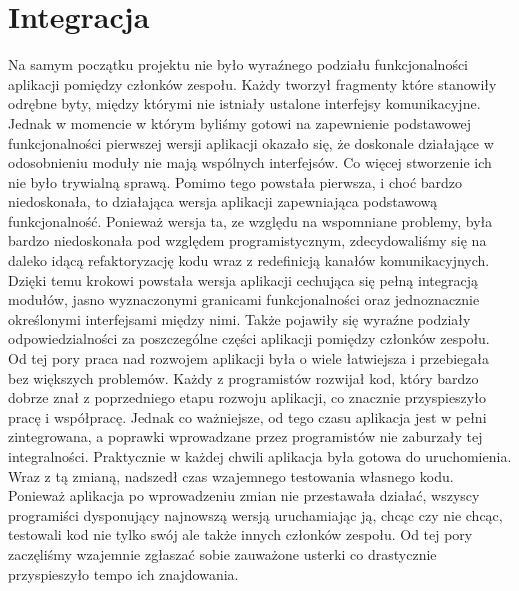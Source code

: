 \section{Integracja}
Na samym początku projektu nie było wyraźnego podziału funkcjonalności aplikacji pomiędzy członków zespołu. Każdy tworzył fragmenty które stanowiły odrębne byty, między którymi nie istniały ustalone interfejsy komunikacyjne. Jednak w momencie w którym byliśmy gotowi na zapewnienie podstawowej funkcjonalności pierwszej wersji aplikacji okazało się, że doskonale działające w odosobnieniu moduły nie mają wspólnych interfejsów. Co więcej stworzenie ich nie było trywialną sprawą. Pomimo tego powstała pierwsza, i choć bardzo niedoskonała, to działająca wersja aplikacji zapewniająca podstawową funkcjonalność.
Ponieważ wersja ta, ze względu na wspomniane problemy, była bardzo niedoskonała pod względem programistycznym, zdecydowaliśmy się na daleko idącą refaktoryzację kodu wraz z redefinicją kanałów komunikacyjnych. Dzięki temu krokowi powstała wersja aplikacji cechująca się pełną integracją modułów, jasno wyznaczonymi granicami funkcjonalności oraz jednoznacznie określonymi interfejsami między nimi. Także pojawiły się wyraźne podziały odpowiedzialności za poszczególne części aplikacji pomiędzy członków zespołu.
Od tej pory praca nad rozwojem aplikacji była o wiele łatwiejsza i przebiegała bez większych problemów. Każdy z programistów rozwijał kod, który bardzo dobrze znał z poprzedniego etapu rozwoju aplikacji, co znacznie przyspieszyło pracę i współpracę. Jednak co ważniejsze, od tego czasu aplikacja jest w pełni zintegrowana, a poprawki wprowadzane przez programistów nie zaburzały tej integralności. Praktycznie w każdej chwili aplikacja była gotowa do uruchomienia.
Wraz z tą zmianą, nadszedł czas wzajemnego testowania własnego kodu. Ponieważ aplikacja po wprowadzeniu zmian nie przestawała działać, wszyscy programiści dysponujący najnowszą wersją uruchamiając ją, chcąc czy nie chcąc, testowali kod nie tylko swój ale także innych członków zespołu. Od tej pory zaczęliśmy wzajemnie zgłaszać sobie zauważone usterki co drastycznie przyspieszyło tempo ich znajdowania.
